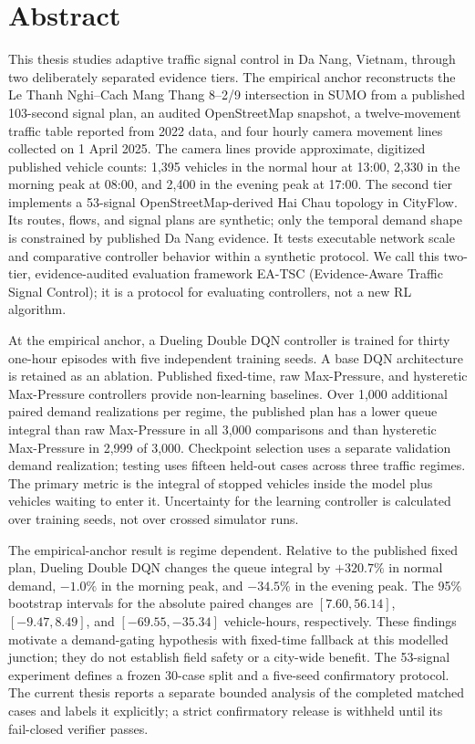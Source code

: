 \documentclass[12pt,a4paper]{report}
\newcommand{\ddqn}{Dueling Double DQN}
\newcommand{\methodname}{EA-TSC}
\begin{document}
\chapter*{Abstract}
This thesis studies adaptive traffic signal control in Da Nang, Vietnam, through two deliberately separated evidence tiers. The empirical anchor reconstructs the Le Thanh Nghi--Cach Mang Thang 8--2/9 intersection in SUMO from a published 103-second signal plan, an audited OpenStreetMap snapshot, a twelve-movement traffic table reported from 2022 data, and four hourly camera movement lines collected on 1 April 2025. The camera lines provide approximate, digitized published vehicle counts: 1,395 vehicles in the normal hour at 13:00, 2,330 in the morning peak at 08:00, and 2,400 in the evening peak at 17:00. The second tier implements a 53-signal OpenStreetMap-derived Hai Chau topology in CityFlow. Its routes, flows, and signal plans are synthetic; only the temporal demand shape is constrained by published Da Nang evidence. It tests executable network scale and comparative controller behavior within a synthetic protocol. We call this two-tier, evidence-audited evaluation framework \methodname{} (Evidence-Aware Traffic Signal Control); it is a protocol for evaluating controllers, not a new RL algorithm.

At the empirical anchor, a \ddqn{} controller is trained for thirty one-hour episodes with five independent training seeds. A base DQN architecture is retained as an ablation. Published fixed-time, raw Max-Pressure, and hysteretic Max-Pressure controllers provide non-learning baselines. Over 1,000 additional paired demand realizations per regime, the published plan has a lower queue integral than raw Max-Pressure in all 3,000 comparisons and than hysteretic Max-Pressure in 2,999 of 3,000. Checkpoint selection uses a separate validation demand realization; testing uses fifteen held-out cases across three traffic regimes. The primary metric is the integral of stopped vehicles inside the model plus vehicles waiting to enter it. Uncertainty for the learning controller is calculated over training seeds, not over crossed simulator runs.

The empirical-anchor result is regime dependent. Relative to the published fixed plan, \ddqn{} changes the queue integral by $+320.7\%$ in normal demand, $-1.0\%$ in the morning peak, and $-34.5\%$ in the evening peak. The 95\% bootstrap intervals for the absolute paired changes are $[7.60,56.14]$, $[-9.47,8.49]$, and $[-69.55,-35.34]$ vehicle-hours, respectively. These findings motivate a demand-gating hypothesis with fixed-time fallback at this modelled junction; they do not establish field safety or a city-wide benefit. The 53-signal experiment defines a frozen 30-case split and a five-seed confirmatory protocol. The current thesis reports a separate bounded analysis of the completed matched cases and labels it explicitly; a strict confirmatory release is withheld until its fail-closed verifier passes.
\end{document}
